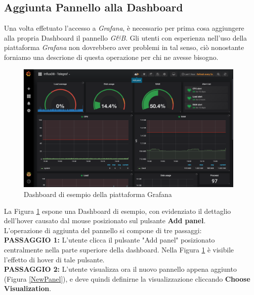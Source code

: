 \subsection{Aggiunta Pannello alla Dashboard}\label{AddPanel}

Una volta effetuato l'accesso a \textit{Grafana}, è necessario per prima cosa aggiungere alla propria Dashboard il pannello \textit{G\&B}. Gli utenti con esperienza nell'uso della piattaforma \textit{Grafana} non dovrebbero aver problemi in tal senso, ciò nonostante forniamo una descrione di questa operazione per chi ne avesse bisogno.\\

\begin{figure}[H]
	\begin{center}
		\includegraphics[scale=0.33]{./images/Dashboard.png}
		 \caption{Dashboard di esempio della piattaforma Grafana}	
		 \label{Dashboard}
	\end{center}
\end{figure}

La Figura \ref{Dashboard} espone una Dashboard di esempio, con evidenziato il dettaglio dell'hover causato dal mouse posizionato sul pulsante \textbf{Add panel}.\\
L'operazione di aggiunta del pannello si compone di tre passaggi:
~\\

\textbf{PASSAGGIO 1:} L'utente clicca il pulsante "Add panel" posizionato centralmente nella parte superiore della dashboard. Nella Figura \ref{Dashboard} è visibile l'effetto di hover di tale pulsante.
~\\

\textbf{PASSAGGIO 2:} L'utente visualizza ora il nuovo pannello appena aggiunto (Figura \ref{NewPanel}), e deve quindi definirne la visualizzazione cliccando \textbf{Choose Visualization}.

